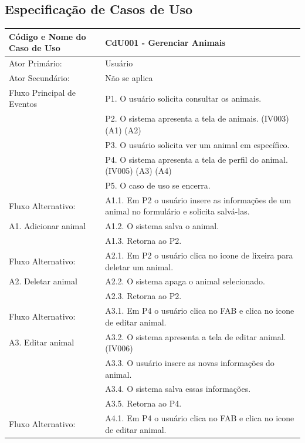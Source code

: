 \documentclass[12pt]{article}
\begin{document}
\begin{titlepage}
\subsection{Especificação de Casos de Uso}

\begin{center}
  \begin{tabular}{ | l |  p{10cm} |}
    \hline
    Código e Nome do Caso de Uso & CdU001 - Gerenciar Animais \\ \hline
    Ator Primário: & Usuário \\ 
    Ator Secundário: & Não se aplica \\ \hline
    Fluxo Principal de Eventos & P1. O usuário solicita consultar os animais. \\
                               & P2. O sistema apresenta a tela de animais. (IV003) (A1) (A2) \\
                               & P3. O usuário solicita ver um animal em específico. \\
			       & P4. O sistema apresenta a tela de perfil do animal. (IV005) (A3) (A4)  \\
                               & P5. O caso de uso se encerra. \\ \hline
    Fluxo Alternativo:         & A1.1. Em P2 o usuário insere as informações de um animal no formulário e solicita salvá-las. \\
    A1. Adicionar animal       & A1.2. O sistema salva o animal. \\ 
			       & A1.3. Retorna ao P2. \\ \hline
    Fluxo Alternativo:         & A2.1. Em P2 o usuário clica no icone de lixeira para deletar um animal. \\
    A2. Deletar animal         & A2.2. O sistema apaga o animal selecionado. \\
			       & A2.3. Retorna ao P2. \\ \hline
    Fluxo Alternativo:         & A3.1. Em P4 o usuário clica no FAB e clica no icone de editar animal. \\
    A3. Editar animal          & A3.2. O sistema apresenta a tela de editar animal. (IV006) \\
			       & A3.3. O usuário insere as novas informações do animal. \\
                               & A3.4. O sistema salva essas informações. \\
			       & A3.5. Retorna ao P4. \\ \hline
    Fluxo Alternativo:         & A4.1. Em P4 o usuário clica no FAB e clica no icone de editar animal. \\

\end{tabular}
\end{center}
\end{titlepage}
\end{document}
